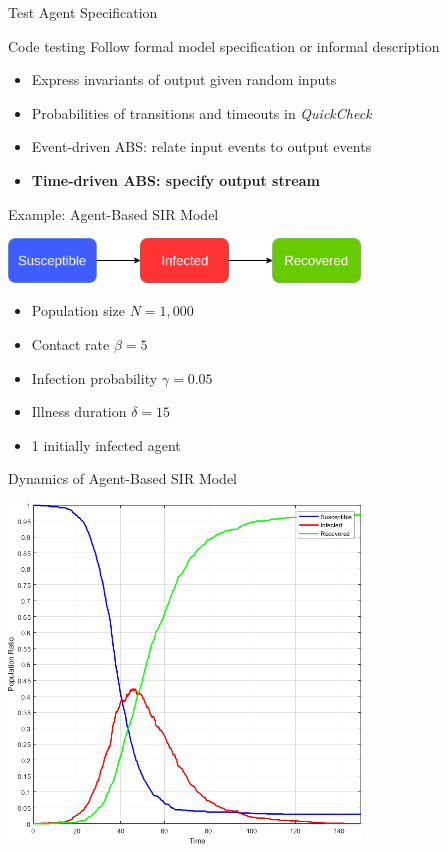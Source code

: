 \documentclass{beamer} %
\begin{document}
\begin{frame}{Test Agent Specification}
\begin{block}{Code testing}
Follow formal model specification or informal description
\end{block}

\begin{block}{}
  \begin{itemize}
  	\item Express invariants of output given random inputs
  	\item Probabilities of transitions and timeouts in \textit{QuickCheck}
    \item Event-driven ABS: relate input events to output events 
    \item \textbf{Time-driven ABS: specify output stream}
  \end{itemize}
\end{block}
\end{frame}

\begin{frame}{Example: Agent-Based SIR Model}
\begin{center}
\includegraphics[width=0.7\textwidth]{./fig/SIR_transitions.png}
\end{center}
  \begin{itemize}
    \item Population size $N = 1,000$
 	\item Contact rate $\beta = 5$
 	\item Infection probability $\gamma = 0.05$
 	\item Illness duration $\delta = 15$
 	\item 1 initially infected agent
  \end{itemize}
\end{frame}

\begin{frame}{Dynamics of Agent-Based SIR Model}
\begin{center}
\includegraphics[width=0.7\textwidth]{./fig/SIR_Yampa_dt001.png}
\end{center}
\end{frame}
\end{document}
